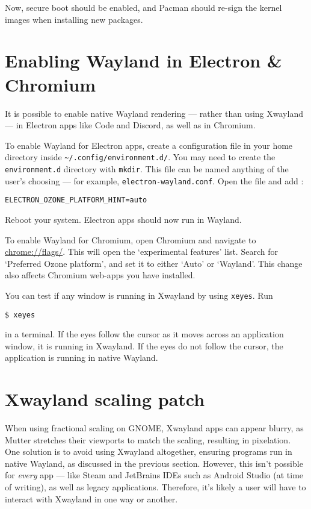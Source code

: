 \documentclass[a4paper]{article}
\begin{document}
Now, secure boot should be enabled, and Pacman should re-sign the kernel images when installing new packages.


\section{Enabling Wayland in Electron \& Chromium}

It is possible to enable native Wayland rendering --- rather than using Xwayland --- in Electron apps like Code and Discord, as well as in Chromium.

To enable Wayland for Electron apps, create a configuration file in your home directory inside \lstinline|~/.config/environment.d/|.
You may need to create the \lstinline|environment.d| directory with \lstinline|mkdir|.
This file can be named anything of the user's choosing --- for example, \lstinline|electron-wayland.conf|.
Open the file and add \cite{arch-wiki-wayland}:
\begin{lstlisting}
ELECTRON_OZONE_PLATFORM_HINT=auto
\end{lstlisting}
Reboot your system.
Electron apps should now run in Wayland.

To enable Wayland for Chromium, open Chromium and navigate to \url{chrome://flags/}.
This will open the `experimental features' list.
Search for `Preferred Ozone platform', and set it to either `Auto' or `Wayland'.
This change also affects Chromium web-apps you have installed.

You can test if any window is running in Xwayland by using \lstinline|xeyes|.
Run
\begin{lstlisting}
$ xeyes
\end{lstlisting}
in a terminal.
If the eyes follow the cursor as it moves across an application window, it is running in Xwayland.
If the eyes do not follow the cursor, the application is running in native Wayland.


\section{Xwayland scaling patch}

When using fractional scaling on GNOME, Xwayland apps can appear blurry, as Mutter stretches their viewports to match the scaling, resulting in pixelation.
One solution is to avoid using Xwayland altogether, ensuring programs run in native Wayland, as discussed in the previous section.
However, this isn't possible for \emph{every} app --- like Steam and JetBrains IDEs such as Android Studio (at time of writing), as well as legacy applications.
Therefore, it's likely a user will have to interact with Xwayland in one way or another.
\end{document}
